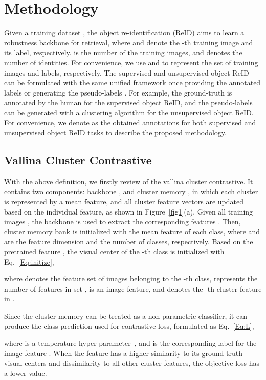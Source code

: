 \documentclass[10pt,twocolumn,letterpaper]{article}
\begin{document}
\section{Methodology}\label{sec:method}
Given a training dataset , the object re-identification (ReID) aims to learn a robustness backbone  for retrieval, where  and  denote the -th training image and its label, respectively.
 is the number of the training images, and  denotes the number of identities. 
For convenience, we use  and  to represent the set of training images and labels, respectively.
The supervised and unsupervised object ReID can be formulated with the same unified framework once providing the annotated labels   or generating the pseudo-labels .
For example, the ground-truth  is annotated by the human for the supervised object ReID, and the pseudo-labels  can be generated with a clustering algorithm for the unsupervised object ReID.
For convenience, we denote  as the obtained annotations for both supervised and unsupervised object ReID tasks to describe the proposed methodology.

\subsection{Vallina Cluster Contrastive}\label{sec:vcc}
With the above definition, we firstly review of the vallina cluster contrastive.
It contains two components: backbone , and cluster memory , in which each cluster is represented by a mean feature, and all cluster feature vectors are updated based on the individual feature, as shown in Figure~\ref{fig1}(a).
Given all training images , the backbone  is used to extract the corresponding features .
Then, cluster memory bank  is initialized with the mean feature of each class, where  and  are the feature dimension and the number of classes, respectively.
Based on the pretrained feature ,  the visual center  of the -th class is initialized with Eq.~\eqref{Eq:initize},

where  denotes the feature set of images belonging to the -th class,  represents the number of features in set ,  is an image feature,
 and  denotes the -th cluster feature in .

Since the cluster memory  can be treated as a non-parametric classifier, it can produce the class prediction used for contrastive loss, formulated as Eq.~\eqref{Eq:L},

where  is a temperature hyper-parameter~\cite{DBLP:conf/cvpr/WuXYL18}, and  is the corresponding label for the image feature . 
When the feature  has a higher similarity to its ground-truth visual centers  and dissimilarity to all other cluster features, the objective loss  has a lower  value.
\end{document}
